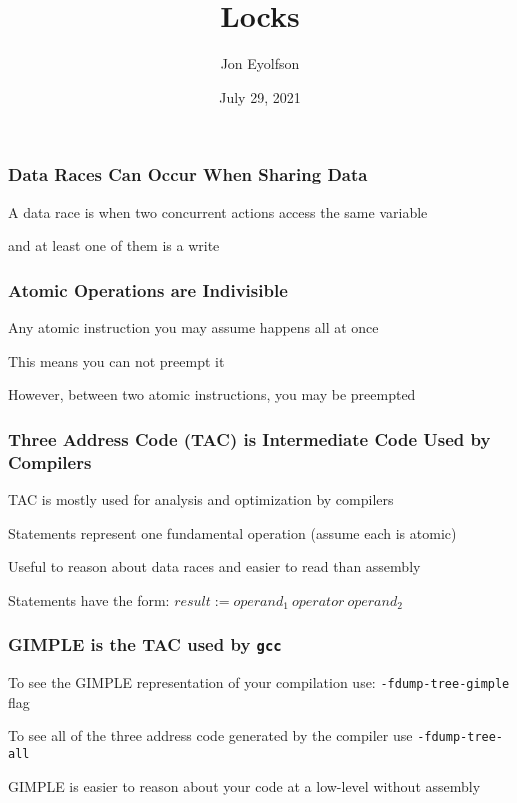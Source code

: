 

\title{Locks}
\author{Jon Eyolfson}
\date{July 29, 2021}


  \begin{frame}
    \titlepage
  \end{frame}

  \begin{frame}
    \frametitle{Data Races Can Occur When Sharing Data}

    A data race is when two concurrent actions access the same variable

    and at least one of them is a write
  \end{frame}

  \begin{frame}
    \frametitle{Atomic Operations are Indivisible}

    Any atomic instruction you may assume happens all at once

    \vspace{2em}

    This means you can not preempt it

    \vspace{2em}

    However, between two atomic instructions, you may be preempted
  \end{frame}

  \begin{frame}
    \frametitle{Three Address Code (TAC) is Intermediate Code Used by Compilers}

    TAC is mostly used for analysis and optimization by compilers

    \vspace{2em}

    Statements represent one fundamental operation (assume each is atomic)

    \hspace{2em} Useful to reason about data races and easier to read than assembly

    \vspace{2em}

    Statements have the form: $result := operand_1\:operator\:operand_2$
  \end{frame}

  \begin{frame}
    \frametitle{GIMPLE is the TAC used by \texttt{gcc}}

    To see the GIMPLE representation of your compilation use:
    {\tt -fdump-tree-gimple} flag

    \vspace{2em}

    To see all of the three address code generated by the compiler use
    {\tt -fdump-tree-all}

    \vspace{2em}

    GIMPLE is easier to reason about your code at a low-level without assembly
  \end{frame}

